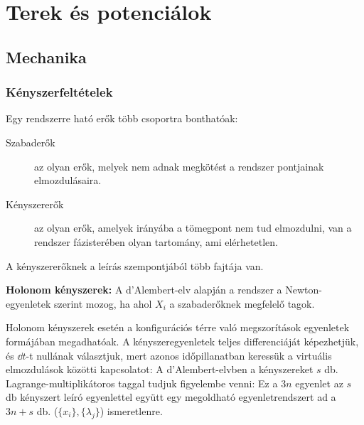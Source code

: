 \chapter{Terek \'es potenci\'alok}
 
 \section{Mechanika}
  
  \subsection{Kényszerfeltételek}\label{ss3:kenyszerfeletetelek}
   
   Egy rendszerre ható erők több csoportra bonthatóak:
   \begin{description}
    \item[Szabaderők] az olyan erők, melyek nem adnak megkötést a rendszer pontjainak elmozdulásaira.
    \item[Kényszererők] az olyan erők, amelyek irányába a tömegpont nem tud elmozdulni, van a rendszer fázisterében olyan tartomány, ami elérhetetlen. 
   \end{description}
   
   A kényszererőknek a leírás szempontjából több fajtája van.
   
   {\bf Holonom kényszerek:}
   A d'Alembert-elv alapján a rendszer a Newton-egyenletek szerint mozog, ha 
   ahol $X_i$ a szabaderőknek megfelelő tagok.
   
   Holonom kényszerek esetén a konfigurációs térre való megszorítások egyenletek formájában megadhatóak. A kényszeregyenletek teljes differenciáját képezhetjük, és $\dd t$-t nullának választjuk, mert azonos időpillanatban keressük a virtuális elmozdulások közötti kapcsolatot:
   A d'Alembert-elvben a kényszereket $s$ db. Lagrange-multiplikátoros taggal tudjuk figyelembe venni:
   Ez a $3n$ egyenlet az $s$ db kényszert leíró egyenlettel együtt egy megoldható egyenletrendszert ad a $3n+s$ db. ($\{x_i\}, \{\lambda_j\}$) ismeretlenre.
    
